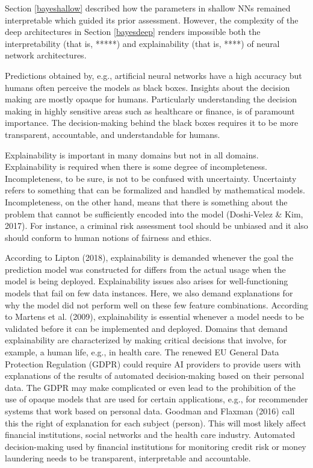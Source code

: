 Section \ref{bayeshallow} described how the parameters 
in shallow NNs remained interpretable which guided
its prior assessment. However, the complexity 
of the deep architectures in Section \ref{bayesdeep}
renders impossible both the interpretability (that is, *****) and explainability (that is, ****) of neural 
network architectures.

Predictions obtained by, e.g., artificial neural networks have a high accuracy but humans
often perceive the models as black boxes. Insights about the decision making are mostly
opaque for humans. Particularly understanding the decision making in highly sensitive
areas such as healthcare or finance, is of paramount importance. The decision-making
behind the black boxes requires it to be more transparent, accountable, and understandable
for humans.

Explainability is important in many domains but not in all domains. 
Explainability is required when there is some degree
of incompleteness. Incompleteness, to be sure, is not to be confused with uncertainty. Uncertainty refers to something that can be formalized and handled by mathematical models. Incompleteness, on the other hand, means that there is something about the problem that cannot be sufficiently encoded into the model (Doshi-Velez & Kim, 2017). For instance, a criminal risk assessment tool should be unbiased and it also should conform to human notions of fairness and ethics.

According to Lipton (2018), explainability is demanded whenever the goal the prediction model was constructed for differs from the actual usage when the model is being deployed. Explainability issues also arises for well-functioning models that fail on few data instances. Here, we also demand explanations for why the model did not perform well on these few feature combinations. According to Martens et al. (2009), explainability is essential whenever a model needs to be validated before it can be implemented and deployed. Domains that demand explainability are characterized by making critical decisions that involve, for example, a human life, e.g., in health care.
The renewed EU General Data Protection Regulation (GDPR) could require AI providers to provide users with explanations of the results of automated decision-making based on their personal data.  The GDPR may make complicated or even lead to the prohibition of the use of opaque models that are used for certain applications, e.g., for recommender systems that work based on personal data. Goodman and Flaxman (2016) call this the right of explanation for each subject (person). This will most likely affect financial institutions, social networks and the health care industry. Automated decision-making used by financial institutions for monitoring credit risk or money laundering needs to be transparent, interpretable and accountable.

